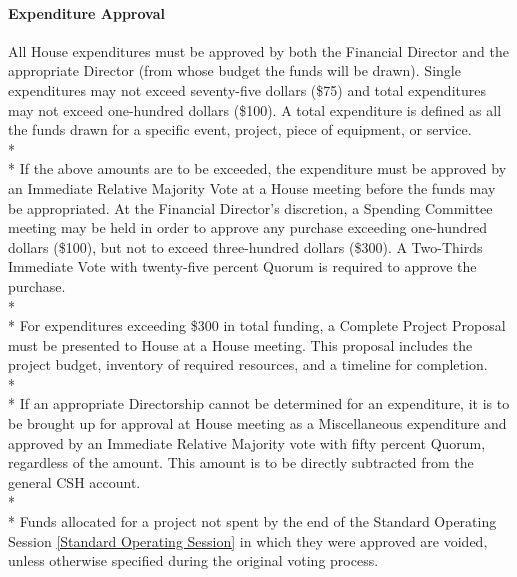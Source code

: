 \documentclass{article}
\newcommand{\asubsubsection}[1]{\paragraph{#1} \label{#1}}
\begin{document}
\asubsubsection{Expenditure Approval}
All House expenditures must be approved by both the Financial Director and the appropriate Director (from whose budget the funds will be drawn).
Single expenditures may not exceed seventy-five dollars (\$75) and total expenditures may not exceed one-hundred dollars (\$100).
A total expenditure is defined as all the funds drawn for a specific event, project, piece of equipment, or service.
\\* \\*
If the above amounts are to be exceeded, the expenditure must be approved by an Immediate Relative Majority Vote at a House meeting before the funds may be appropriated.
At the Financial Director's discretion, a Spending Committee meeting may be held in order to approve any purchase exceeding one-hundred dollars (\$100), but not to exceed three-hundred dollars (\$300).
A Two-Thirds Immediate Vote with twenty-five percent Quorum is required to approve the purchase.
\\*\\*
For expenditures exceeding \$300 in total funding, a Complete Project Proposal must be presented to House at a House meeting.
This proposal includes the project budget, inventory of required resources, and a timeline for completion.
\\* \\*
If an appropriate Directorship cannot be determined for an expenditure, it is to be brought up for approval at House meeting as a Miscellaneous expenditure and approved by an Immediate Relative Majority vote with fifty percent Quorum, regardless of the amount.
This amount is to be directly subtracted from the general CSH account.
\\* \\*
Funds allocated for a project not spent by the end of the Standard Operating Session \ref{Standard Operating Session} in which they were approved are voided, unless otherwise specified during the original voting process.
\end{document}
